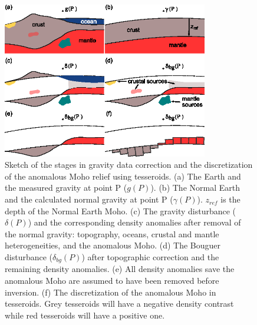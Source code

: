 \begin{figure}
    \centering
    \includegraphics[width=0.8\textwidth]{figures/paper-moho/problem-concept}
    \caption{
        Sketch of the stages in gravity data correction and
        the discretization of the anomalous Moho relief using tesseroids.
        (a) The Earth and the measured gravity at point P ($g(P)$).
        (b) The Normal Earth and the calculated normal gravity at point P
        ($\gamma(P)$). $z_{ref}$ is the depth of the Normal Earth Moho.
        (c) The gravity disturbance ($\delta(P)$) and the corresponding density
        anomalies after removal of the normal gravity: topography, oceans,
        crustal and mantle heterogeneities, and the anomalous Moho.
        (d) The Bouguer disturbance ($\delta_{bg}(P)$) after topographic
        correction and the remaining density anomalies.
        (e) All density anomalies save the anomalous Moho are assumed to have
        been removed before inversion.
        (f) The discretization of the anomalous Moho in tesseroids. Grey
        tesseroids will have a negative density contrast while red tesseroids
        will have a positive one.
    }
    \label{fig:moho-anomalysketch}
\end{figure}

